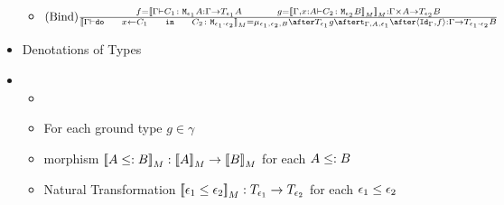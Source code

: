 \documentclass{report}
\begin{document}
\begin{itemize}
\begin{itemize}
        \item $\treerule{Bind}{f = \deno{\typerelation{\G}{C_1}{\M{\e_1}{A}} : \G \rightarrow \T{\e_1}{A}\s\s g = \deno{\typerelation{\G, x: A}{C_2}{\M{\e_2}{B}}}}: \G \times A \rightarrow \T{\e_2}{B}}{\deno{\typerelation{\G}{\doin{x}{C_1}{C_2}}{\M{\e_1 \cdot \e_2}}} = \bind{\e_1}{\e_2}{B} \after \T{\e_1}{g} \after \tstrength{\G}{A}{\e_1} \after \pr{\Id{\G}}{f}: \G \rightarrow \T{\e_1 \cdot \e_2}{B}}$
    \end{itemize}
    \item Denotations of Types
    \item \begin{itemize}
        \item  {}
        \item For each ground type $g \in \gamma$
        \item morphism ${\bf [\![}A \leq: B{\bf ]\!]}_M : {\bf [\![}A{\bf ]\!]}_M \rightarrow {\bf [\![}B{\bf ]\!]}_M$ for each $A \leq: B$
        \item Natural Transformation ${\bf [\![}\epsilon_1 \leq \epsilon_2{\bf ]\!]}_M: T_{\epsilon_1}{} \rightarrow T_{\epsilon_2}{}$ for each $\epsilon_1 \leq \epsilon_2$
    \end{itemize}
    
\end{itemize}
    
\end{document}
